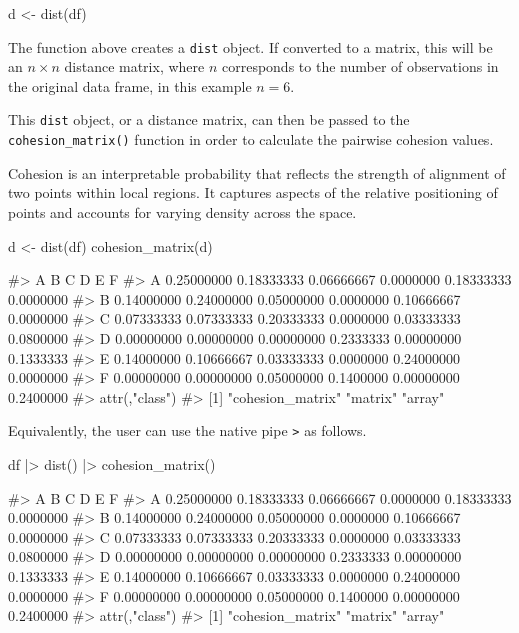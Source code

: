 \begin{Schunk}
\begin{Sinput}
d <- dist(df)
\end{Sinput}
\end{Schunk}

The function above creates a \texttt{dist} object. If converted to a
matrix, this will be an \(n\times n\) distance matrix, where \(n\)
corresponds to the number of observations in the original data frame, in
this example \(n = 6\).

This \texttt{dist} object, or a distance matrix, can then be passed to
the \texttt{cohesion\_matrix()} function in order to calculate the
pairwise cohesion values.

Cohesion is an interpretable probability that reflects the strength of
alignment of two points within local regions. It captures aspects of the
relative positioning of points and accounts for varying density across
the space.

\begin{Schunk}
\begin{Sinput}
d <- dist(df)
cohesion_matrix(d)
\end{Sinput}
\begin{Soutput}
#>            A          B          C         D          E         F
#> A 0.25000000 0.18333333 0.06666667 0.0000000 0.18333333 0.0000000
#> B 0.14000000 0.24000000 0.05000000 0.0000000 0.10666667 0.0000000
#> C 0.07333333 0.07333333 0.20333333 0.0000000 0.03333333 0.0800000
#> D 0.00000000 0.00000000 0.00000000 0.2333333 0.00000000 0.1333333
#> E 0.14000000 0.10666667 0.03333333 0.0000000 0.24000000 0.0000000
#> F 0.00000000 0.00000000 0.05000000 0.1400000 0.00000000 0.2400000
#> attr(,"class")
#> [1] "cohesion_matrix" "matrix"          "array"
\end{Soutput}
\end{Schunk}

Equivalently, the user can use the native pipe
\texttt{\textbar{}\textgreater{}} as follows.

\begin{Schunk}
\begin{Sinput}
df |>
  dist() |>
  cohesion_matrix()
\end{Sinput}
\begin{Soutput}
#>            A          B          C         D          E         F
#> A 0.25000000 0.18333333 0.06666667 0.0000000 0.18333333 0.0000000
#> B 0.14000000 0.24000000 0.05000000 0.0000000 0.10666667 0.0000000
#> C 0.07333333 0.07333333 0.20333333 0.0000000 0.03333333 0.0800000
#> D 0.00000000 0.00000000 0.00000000 0.2333333 0.00000000 0.1333333
#> E 0.14000000 0.10666667 0.03333333 0.0000000 0.24000000 0.0000000
#> F 0.00000000 0.00000000 0.05000000 0.1400000 0.00000000 0.2400000
#> attr(,"class")
#> [1] "cohesion_matrix" "matrix"          "array"
\end{Soutput}
\end{Schunk}

